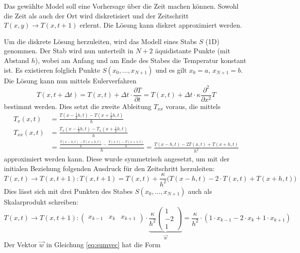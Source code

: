 Das gewählte Model soll eine Vorhersage über die Zeit machen können.
Sowohl die Zeit als auch der Ort wird diskretisiert und der Zeitschritt
$T(x,y) \rightarrow T(x,t+1)$ erlernt. Die Lösung kann diskret
approximiert werden.

Um die diskrete Lösung herzuleiten, wird das Modell eines Stabs $S$
(1D) genommen. Der Stab wird nun unterteilt in $N+2$ äquidistante
Punkte (mit Abstand $h$), wobei am Anfang und am Ende des Stabes
die Temperatur konstant ist. Es existieren folglich Punkte $S(x_0,
\dots, x_{N+1})$ und es gilt $x_0 = a$, $x_{N+1} = b$.
Die Lösung kann nun mittels Eulerverfahren
\begin{equation}
T(x,t+\Delta t) = T(x,t) + \Delta t \cdot  \frac{\partial T}{\partial t} = T(x,t) + \Delta t \cdot \kappa \frac{\partial^2}{\partial x^2} T
\end{equation}
bestimmt werden. Dies setzt die zweite Ableitung $T_{xx}$ voraus,
die mittels
\begin{align}
T_{x}(x, t)  &= \frac{T(x-\frac{1}{2}h, t) - T(x+\frac{1}{2}h, t)}{h}\\
T_{xx}(x, t) &= \frac{T_{x}(x-\frac{1}{2}h, t) - T_{x}(x+\frac{1}{2}h, t)}{h} \\
&= \frac{\frac{T(x-h, t) - T(x+h, t)}{h} - \frac{T(x, t) - T(x+1,t)}{h}}{h} = \frac{T(x-h, t) - 2 T(x, t) + T(x+h, t)}{h^{2}}
\end{align}	
approximiert werden kann.
Diese wurde symmetrisch angesetzt, um mit der initialen Beziehung
folgenden Ausdruck für den Zeitschritt herzuleiten:
\begin{equation}
T(x,t) \rightarrow T(x,t+1) : T(x,t+1) = T(x,t) + \frac{\kappa}{h^{2}} \Big( T(x-h,t) - 2 \cdot T(x,t) + T(x+h,t)  \Big)
\end{equation}
Dies lässt sich mit drei Punkten des Stabes $S(x_0, \dots, x_{N+1})$
auch als Skalarprodukt schreiben:
\begin{equation}
T(x,t) \rightarrow T(x,t+1) : \begin{pmatrix} x_{k-1} & x_{k} & x_{k+1} \end{pmatrix} \cdot \underbrace{\frac{\kappa}{h^2} \begin{pmatrix} 1 \\ -2 \\ 1 \end{pmatrix}}_{\displaystyle\vec{w}} =  \frac{\kappa}{h^2} \cdot \left( 1 \cdot x_{k-1} - 2 \cdot x_{k} + 1 \cdot x_{k+1} \right)
\label{eq:sumvec}
\end{equation}
Der Vektor $\vec{w}$ in Gleichung \eqref{eq:sumvec} hat die Form
